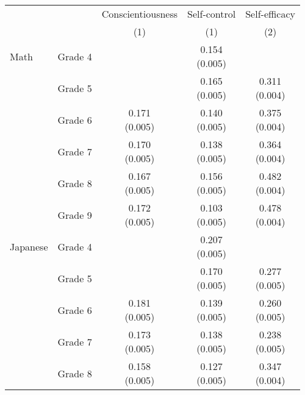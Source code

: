 \begin{tabular}{llccc}
\hline \hline
 &  & Conscientiousness & Self-control & Self-efficacy \\
 &  & (1) & (1) & (2) \\
\hline 
Math & Grade 4 &  & \makecell[tc]{0.154\\(0.005)} &  \\
 & Grade 5 &  & \makecell[tc]{0.165\\(0.005)} & \makecell[tc]{0.311\\(0.004)} \\
 & Grade 6 & \makecell[tc]{0.171\\(0.005)} & \makecell[tc]{0.140\\(0.005)} & \makecell[tc]{0.375\\(0.004)} \\
 & Grade 7 & \makecell[tc]{0.170\\(0.005)} & \makecell[tc]{0.138\\(0.005)} & \makecell[tc]{0.364\\(0.004)} \\
 & Grade 8 & \makecell[tc]{0.167\\(0.005)} & \makecell[tc]{0.156\\(0.005)} & \makecell[tc]{0.482\\(0.004)} \\
 & Grade 9 & \makecell[tc]{0.172\\(0.005)} & \makecell[tc]{0.103\\(0.005)} & \makecell[tc]{0.478\\(0.004)} \\
\hline 
Japanese & Grade 4 &  & \makecell[tc]{0.207\\(0.005)} &  \\
 & Grade 5 &  & \makecell[tc]{0.170\\(0.005)} & \makecell[tc]{0.277\\(0.005)} \\
 & Grade 6 & \makecell[tc]{0.181\\(0.005)} & \makecell[tc]{0.139\\(0.005)} & \makecell[tc]{0.260\\(0.005)} \\
 & Grade 7 & \makecell[tc]{0.173\\(0.005)} & \makecell[tc]{0.138\\(0.005)} & \makecell[tc]{0.238\\(0.005)} \\
 & Grade 8 & \makecell[tc]{0.158\\(0.005)} & \makecell[tc]{0.127\\(0.005)} & \makecell[tc]{0.347\\(0.004)} \\

\end{tabular}
